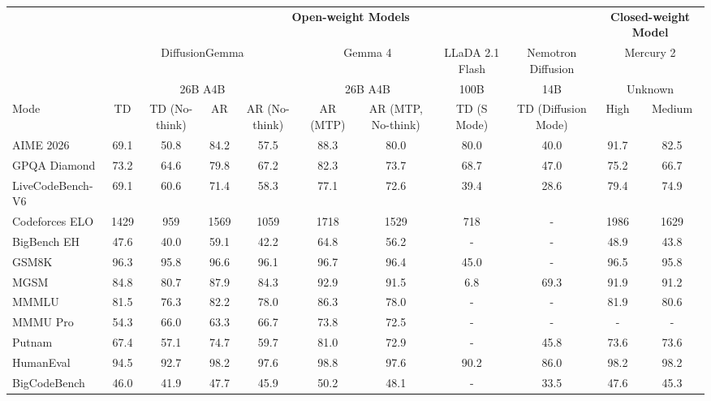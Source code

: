 \documentclass[11pt, a4paper, logo, copyright, gdm]{google}
\begin{document}
\begin{landscape} %

\begin{table}[t!]
\centering
\footnotesize
\setlength{\tabcolsep}{3pt}
\begin{tabular}{lcccccccccc}
\toprule
 & \multicolumn{8}{c}{\textbf{Open-weight Models}} & \multicolumn{2}{c}{\textbf{Closed-weight Model}} \\
\cmidrule(r){2-9} \cmidrule(l){10-11}
 & \multicolumn{4}{c}{DiffusionGemma} & \multicolumn{2}{c}{Gemma 4} & LLaDA 2.1 Flash & Nemotron Diffusion & \multicolumn{2}{c}{Mercury 2} \\
 & \multicolumn{4}{c}{26B A4B} & \multicolumn{2}{c}{26B A4B} & 100B & 14B & \multicolumn{2}{c}{Unknown} \\
\cmidrule(r){2-5} \cmidrule(r){6-7} \cmidrule(r){8-8} \cmidrule(r){9-9} \cmidrule(l){10-11}
Mode & TD & TD (No-think) & AR & AR (No-think) & AR (MTP) & AR (MTP, No-think) & TD (S Mode) & TD (Diffusion Mode) & High & Medium \\
\midrule
AIME 2026 & 69.1 & 50.8 & 84.2 & 57.5 & 88.3 & 80.0 & 80.0 & 40.0 & 91.7 & 82.5 \\
GPQA Diamond & 73.2 & 64.6 & 79.8 & 67.2 & 82.3 & 73.7 & 68.7 & 47.0 & 75.2 & 66.7 \\
LiveCodeBench-V6 & 69.1 & 60.6 & 71.4 & 58.3 & 77.1 & 72.6 & 39.4 & 28.6 & 79.4 & 74.9 \\
Codeforces ELO & 1429 & 959 & 1569 & 1059 & 1718 & 1529 & 718 & - & 1986 & 1629 \\
BigBench EH & 47.6 & 40.0 & 59.1 & 42.2 & 64.8 & 56.2 & - & - & 48.9 & 43.8 \\
GSM8K & 96.3 & 95.8 & 96.6 & 96.1 & 96.7 & 96.4 & 45.0 & - & 96.5 & 95.8 \\
MGSM & 84.8 & 80.7 & 87.9 & 84.3 & 92.9 & 91.5 & 6.8 & 69.3 & 91.9 & 91.2 \\
MMMLU & 81.5 & 76.3 & 82.2 & 78.0 & 86.3 & 78.0 & - & - & 81.9 & 80.6 \\
MMMU Pro & 54.3 & 66.0 & 63.3 & 66.7 & 73.8 & 72.5 & - & - & - & - \\
Putnam & 67.4 & 57.1 & 74.7 & 59.7 & 81.0 & 72.9 & - & 45.8 & 73.6 & 73.6 \\
HumanEval & 94.5 & 92.7 & 98.2 & 97.6 & 98.8 & 97.6 & 90.2 & 86.0 & 98.2 & 98.2 \\
BigCodeBench & 46.0 & 41.9 & 47.7 & 45.9 & 50.2 & 48.1 & - & 33.5 & 47.6 & 45.3 \\

\end{tabular}
\end{table}
\end{landscape}
\end{document}
